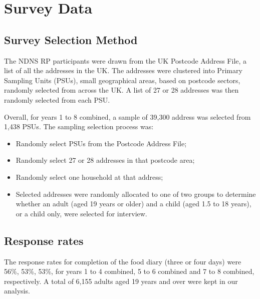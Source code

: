 
\section{Survey Data}\vspace{-0.3cm}

\subsection{Survey Selection Method}\vspace{-0.3cm}

The NDNS RP participants were drawn from the UK Postcode Address File, a list of all the addresses in the UK. The addresses were clustered into Primary Sampling Units (PSUs), small geographical areas, based on postcode sectors, randomly selected from across the UK. A list of 27 or 28 addresses was then randomly selected from each PSU.

Overall, for years 1 to 8 combined, a sample of 39,300 address was selected from 1,438 PSUs. The sampling selection process was: 

\begin{itemize}
	\item Randomly select PSUs from the Postcode Address File; 
	\item Randomly select 27 or 28 addresses in that postcode area; 
	\item Randomly select one household at that address; 
	\item Selected addresses were randomly allocated to one of two groups to determine whether an adult (aged 19 years or older) and a child (aged 1.5 to 18 years), or a child only, were selected for interview.
\end{itemize}
\vspace{-0.6cm}
\subsection{Response rates}\vspace{-0.3cm}

The response rates for completion of the food diary (three or four days) were 56\%, 53\%, 53\%, for years 1 to 4 combined, 5 to 6 combined and 7 to 8 combined, respectively. A total of 6,155 adults aged 19 years and over were kept in our analysis. 
\vspace{-1.2cm}

